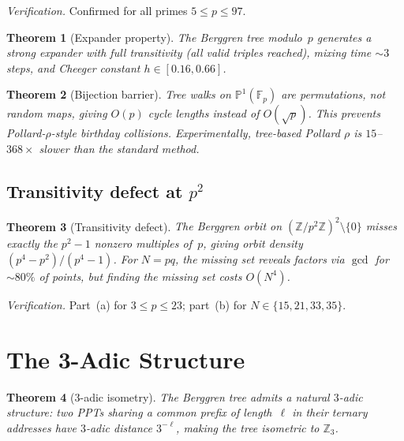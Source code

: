 \documentclass[12pt]{amsart}
\newtheorem{theorem}{Theorem}[section]
\theoremstyle{definition}
\theoremstyle{remark}
\begin{document}
\noindent
\textit{Verification.} Confirmed for all primes $5 \le p \le 97$.

\begin{theorem}[Expander property]\label{thm:expander}
The Berggren tree modulo~$p$ generates a strong expander with full
transitivity (all valid triples reached), mixing time $\sim 3$ steps, and
Cheeger constant $h \in [0.16, 0.66]$.
\end{theorem}

\begin{theorem}[Bijection barrier]\label{thm:bijection}
Tree walks on $\mathbb{P}^1(\mathbb{F}_p)$ are permutations, not random maps,
giving $O(p)$ cycle lengths instead of $O(\sqrt{p})$. This prevents
Pollard-$\rho$-style birthday collisions. Experimentally, tree-based
Pollard $\rho$ is $15$--$368\times$ slower than the standard method.
\end{theorem}

\subsection{Transitivity defect at $p^2$}

\begin{theorem}[Transitivity defect]\label{thm:transit-defect}
The Berggren orbit on $(\mathbb{Z}/p^2\mathbb{Z})^2 \setminus \{0\}$ misses
exactly the $p^2-1$ nonzero multiples of~$p$, giving orbit density
$(p^4 - p^2)/(p^4 - 1)$. For $N = pq$, the missing set reveals factors via
$\gcd$ for $\sim 80\%$ of points, but finding the missing set costs $O(N^4)$.
\end{theorem}

\noindent
\textit{Verification.} Part~(a) for $3 \le p \le 23$; part~(b) for
$N \in \{15, 21, 33, 35\}$.


\section{The 3-Adic Structure}\label{sec:3adic}

\begin{theorem}[3-adic isometry]\label{thm:3adic}
The Berggren tree admits a natural $3$-adic structure: two PPTs sharing a
common prefix of length~$\ell$ in their ternary addresses have $3$-adic
distance $3^{-\ell}$, making the tree isometric to $\mathbb{Z}_3$.
\end{theorem}
\end{document}
